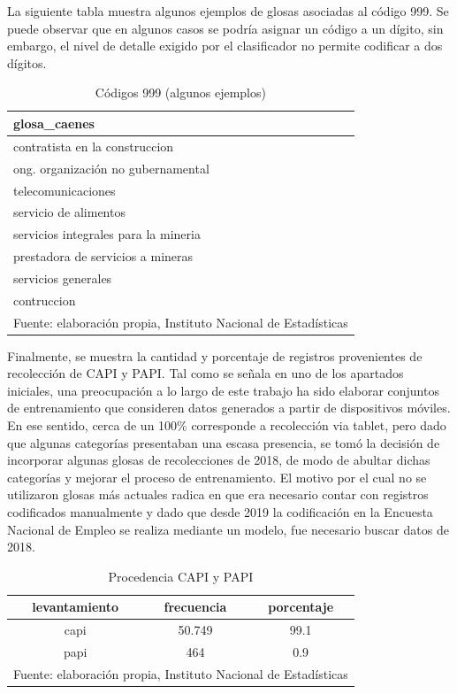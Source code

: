 \documentclass[
  12pt,
  spanish,
]{article}
\begin{document}
La siguiente tabla muestra algunos ejemplos de glosas asociadas al
código 999. Se puede observar que en algunos casos se podría asignar un
código a un dígito, sin embargo, el nivel de detalle exigido por el
clasificador no permite codificar a dos dígitos.

\begin{table}[H]

\caption{\label{tab:glosas 999}\label{cod_999_caenes}Códigos 999 (algunos ejemplos)}
\centering
\fontsize{9.5}{11.5}\selectfont
\begin{tabular}[t]{l}
\toprule
glosa\_caenes\\
\midrule
contratista en la construccion\\
ong. organización no gubernamental\\
telecomunicaciones\\
servicio de alimentos\\
servicios integrales para la mineria\\
\addlinespace
prestadora de servicios a mineras\\
servicios generales\\
contruccion\\
\bottomrule
\multicolumn{1}{l}{\rule{0pt}{1em}Fuente: elaboración propia, Instituto Nacional de Estadísticas }\\
\end{tabular}
\end{table}

Finalmente, se muestra la cantidad y porcentaje de registros
provenientes de recolección de CAPI y PAPI. Tal como se señala en uno de
los apartados iniciales, una preocupación a lo largo de este trabajo ha
sido elaborar conjuntos de entrenamiento que consideren datos generados
a partir de dispositivos móviles. En ese sentido, cerca de un 100\%
corresponde a recolección via tablet, pero dado que algunas categorías
presentaban una escasa presencia, se tomó la decisión de incorporar
algunas glosas de recolecciones de 2018, de modo de abultar dichas
categorías y mejorar el proceso de entrenamiento. El motivo por el cual
no se utilizaron glosas más actuales radica en que era necesario contar
con registros codificados manualmente y dado que desde 2019 la
codificación en la Encuesta Nacional de Empleo se realiza mediante un
modelo, fue necesario buscar datos de 2018.

\begin{table}[H]

\caption{\label{tab:procedencia_capi_papi_caenes}\label{capi_papi}Procedencia CAPI y PAPI}
\centering
\fontsize{9.5}{11.5}\selectfont
\begin{tabular}[t]{ccc}
\toprule
levantamiento & frecuencia & porcentaje\\
\midrule
capi & 50.749 & 99.1\\
papi & 464 & 0.9\\
\bottomrule
\multicolumn{3}{l}{\rule{0pt}{1em}Fuente: elaboración propia, Instituto Nacional de Estadísticas }\\
\end{tabular}
\end{table}
\end{document}

